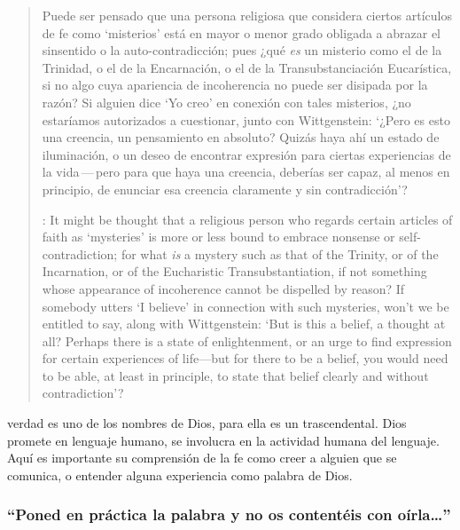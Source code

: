 \blockquote[{\cite[211]{teichmann2008ans}}: It might be thought that a religious person who regards certain articles of faith as `mysteries' is more or less bound to embrace nonsense or self-contradiction; for what \emph{is} a mystery such as that of the Trinity, or of the Incarnation, or of the Eucharistic Transubstantiation, if not something whose appearance of incoherence cannot be dispelled by reason? If somebody utters `I believe' in connection with such mysteries, won't we be entitled to say, along with Wittgenstein: `But is this a belief, a thought at all? Perhaps there is a state of enlightenment, or an urge to find expression for certain experiences of life---but for there to be a belief, you would need to be able, at least in principle, to state that belief clearly and without contradiction'?]{Puede ser pensado que una persona religiosa que considera ciertos artículos de fe como `misterios' está en mayor o menor grado obligada a abrazar el sinsentido o la auto-contradicción; pues ¿qué \emph{es} un misterio como el de la Trinidad, o el de la Encarnación, o el de la Transubstanciación Eucarística, si no algo cuya apariencia de incoherencia no puede ser disipada por la razón? Si alguien dice `Yo creo' en conexión con tales misterios, ¿no estaríamos autorizados a cuestionar, junto con Wittgenstein: `¿Pero es esto una creencia, un pensamiento en absoluto? Quizás haya ahí un estado de iluminación, o un deseo de encontrar expresión para ciertas experiencias de la vida\,---\,pero para que haya una creencia, deberías ser capaz, al menos en principio, de enunciar esa creencia claramente y sin contradicción'?}

verdad es uno de los nombres de Dios, para ella es un trascendental. Dios promete en lenguaje humano, se involucra en la actividad humana del lenguaje. Aquí es importante su comprensión de la fe como creer a alguien que se comunica, o entender alguna experiencia como palabra de Dios.

\subsubsection{\enquote{Poned en práctica la palabra y no os contentéis con oírla\ldots}}
